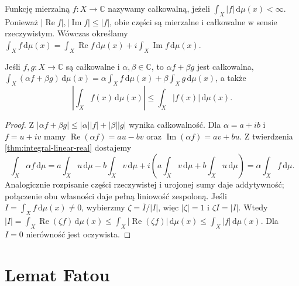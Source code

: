 \begin{definicja}
\label{def:complex-integral}
Funkcję mierzalną $f:X\to\mathbb C$ nazywamy
całkowalną, jeżeli $\int_X|f|\,\mathrm d\mu(x)<\infty$.
Ponieważ $|\operatorname{Re}f|,|\operatorname{Im}f|\le |f|$,
obie części są mierzalne i całkowalne w sensie rzeczywistym.
Wówczas określamy
$\int_Xf\,\mathrm d\mu(x)=
\int_X\operatorname{Re}f\,\mathrm d\mu(x)+
 i\int_X\operatorname{Im}f\,\mathrm d\mu(x)$.
\end{definicja}

\begin{twierdzenie}
\label{thm:integral-complex-linear}
Jeśli $f,g:X\to\mathbb C$ są całkowalne i
$\alpha,\beta\in\mathbb C$, to $\alpha f+\beta g$
jest całkowalna,
$\int_X(\alpha f+\beta g)\,\mathrm d\mu(x)=
\alpha\int_Xf\,\mathrm d\mu(x)+
\beta\int_Xg\,\mathrm d\mu(x)$, a także
\[
\left|\int_Xf(x)\,\mathrm d\mu(x)\right|
\le\int_X|f(x)|\,\mathrm d\mu(x).
\]
\end{twierdzenie}
\begin{proof}
Z $|\alpha f+\beta g|\le|\alpha||f|+|\beta||g|$
wynika całkowalność. Dla $\alpha=a+ib$ i $f=u+iv$
mamy $\operatorname{Re}(\alpha f)=au-bv$ oraz
$\operatorname{Im}(\alpha f)=av+bu$. Z twierdzenia
\ref{thm:integral-linear-real} dostajemy
\[
 \int_X\alpha f\,\mathrm d\mu
 =a\int_Xu\,\mathrm d\mu-b\int_Xv\,\mathrm d\mu
 +i\left(a\int_Xv\,\mathrm d\mu+b\int_Xu\,\mathrm d\mu\right)
 =\alpha\int_X f\,\mathrm d\mu.
\]
Analogicznie rozpisanie części rzeczywistej i urojonej
sumy daje addytywność; połączenie obu własności daje
pełną liniowość zespoloną.
Jeśli $I=\int_Xf\,\mathrm d\mu(x)\ne0$, wybierzmy
$\zeta=\overline I/|I|$, więc $|\zeta|=1$ i
$\zeta I=|I|$. Wtedy
$|I|=\int_X\operatorname{Re}(\zeta f)\,\mathrm d\mu(x)
\le\int_X|\operatorname{Re}(\zeta f)|\,\mathrm d\mu(x)
\le\int_X|f|\,\mathrm d\mu(x)$.
Dla $I=0$ nierówność jest oczywista.
\end{proof}

\section{Lemat Fatou}

